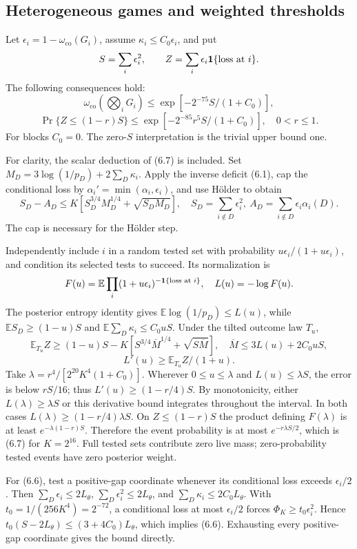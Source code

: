 \documentclass[11pt,reqno]{amsart}
\numberwithin{equation}{section}
\begin{document}
\subsection{Heterogeneous games and weighted thresholds}\label{heterogeneous-games-and-weighted-thresholds}

Let \(\epsilon_i=1-\omega_{\mathrm{co}}(G_i)\), assume \(\kappa_i\le C_0\epsilon_i\), and put \[
 S=\sum_i\epsilon_i^2,\qquad
 Z=\sum_i\epsilon_i{\bf1}\{\text{loss at }i\}.
\] The following consequences hold: \[
 \boxed{\omega_{\mathrm{co}}(\bigotimes_iG_i)
 \le\exp[-2^{-75}S/(1+C_0)],} \tag{6.6}
\] \[
 \boxed{\Pr\{Z\le(1-r)S\}
 \le\exp[-2^{-85}r^5 S/(1+C_0)],
 \quad0<r\le1.} \tag{6.7}
\] For blocks \(C_0=0\). The zero-\(S\) interpretation is the trivial upper bound one.

For clarity, the scalar deduction of (6.7) is included. Set \(M_D=3\log(1/p_D)+2\sum_D\kappa_i\). Apply the inverse deficit (6.1), cap the conditional loss by \(\alpha_i'=\min(\alpha_i,\epsilon_i)\), and use Hölder to obtain \[
 S_D-A_D\le K[S_D^{3/4}M_D^{1/4}+\sqrt{S_DM_D}],
\quad S_D=\sum_{i\notin D}\epsilon_i^2,\ 
 A_D=\sum_{i\notin D}\epsilon_i\alpha_i(D).
\] The cap is necessary for the Hölder step.

Independently include \(i\) in a random tested set with probability \(u\epsilon_i/(1+u\epsilon_i)\), and condition its selected tests to succeed. Its normalization is \[
 F(u)=\mathbb E\prod_i(1+u\epsilon_i)^{-{\bf1}\{\text{loss at }i\}},
\quad L(u)=-\log F(u).
\] The posterior entropy identity gives \(\mathbb E\log(1/p_D)\le L(u)\), while \(\mathbb ES_D\ge(1-u)S\) and \(\mathbb E\sum_D\kappa_i\le C_0uS\). Under the tilted outcome law \(T_u\), \[
 \mathbb E_{T_u}Z\ge(1-u)S
 -K[S^{3/4}\overline M^{1/4}+\sqrt{S\overline M}],
\quad\overline M\le3L(u)+2C_0uS,
\] \[
 L'(u)\ge\mathbb E_{T_u}Z/(1+u).
\] Take \(\lambda=r^4/[2^{20}K^4(1+C_0)]\). Wherever \(0\le u\le\lambda\) and \(L(u)\le\lambda S\), the error is below \(rS/16\); thus \(L'(u)\ge(1-r/4)S\). By monotonicity, either \(L(\lambda)\ge\lambda S\) or this derivative bound integrates throughout the interval. In both cases \(L(\lambda)\ge(1-r/4)\lambda S\). On \(Z\le(1-r)S\) the product defining \(F(\lambda)\) is at least \(e^{-\lambda(1-r)S}\). Therefore the event probability is at most \(e^{-r\lambda S/2}\), which is (6.7) for \(K=2^{16}\). Full tested sets contribute zero live mass; zero-probability tested events have zero posterior weight.

For (6.6), test a positive-gap coordinate whenever its conditional loss exceeds \(\epsilon_i/2\). Then \(\sum_D\epsilon_i\le2L_\theta\), \(\sum_D\epsilon_i^2\le2L_\theta\), and \(\sum_D\kappa_i\le2C_0L_\theta\). With \(t_0=1/(256K^4)=2^{-72}\), a conditional loss at most \(\epsilon_i/2\) forces \(\Phi_K\ge t_0\epsilon_i^2\). Hence \(t_0(S-2L_\theta)\le(3+4C_0)L_\theta\), which implies (6.6). Exhausting every positive-gap coordinate gives the bound directly.
\end{document}
